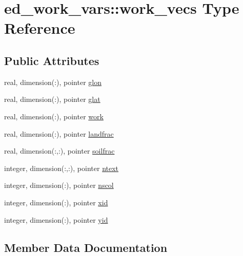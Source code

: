 \hypertarget{structed__work__vars_1_1work__vecs}{}\section{ed\+\_\+work\+\_\+vars\+:\+:work\+\_\+vecs Type Reference}
\label{structed__work__vars_1_1work__vecs}
\subsection*{Public Attributes}
\begin{DoxyCompactItemize}
\item 
real, dimension(\+:), pointer \hyperlink{structed__work__vars_1_1work__vecs_abee061861a4c4f6dfbc1bc8ec18a463b}{glon}
\item 
real, dimension(\+:), pointer \hyperlink{structed__work__vars_1_1work__vecs_a957e7ab559f48443828e710632887d48}{glat}
\item 
real, dimension(\+:), pointer \hyperlink{structed__work__vars_1_1work__vecs_aa5dbf6c86b514fd72da0b0121693fcb9}{work}
\item 
real, dimension(\+:), pointer \hyperlink{structed__work__vars_1_1work__vecs_a706bea04b2f0bd207bb88b24151b31f3}{landfrac}
\item 
real, dimension(\+:,\+:), pointer \hyperlink{structed__work__vars_1_1work__vecs_aaf7951b3fc6d10862e1a9110027766ea}{soilfrac}
\item 
integer, dimension(\+:,\+:), pointer \hyperlink{structed__work__vars_1_1work__vecs_a898272bb541b0bd262ff3efe1a0f919d}{ntext}
\item 
integer, dimension(\+:), pointer \hyperlink{structed__work__vars_1_1work__vecs_abcd125ac3a76abc44387395c1746d25b}{nscol}
\item 
integer, dimension(\+:), pointer \hyperlink{structed__work__vars_1_1work__vecs_afff01fc8dd99c5d3bbe9bbea9234381a}{xid}
\item 
integer, dimension(\+:), pointer \hyperlink{structed__work__vars_1_1work__vecs_a456fdc2f1a35f3a46bab6d6affac952e}{yid}
\end{DoxyCompactItemize}


\subsection{Member Data Documentation}
\mbox{\label{structed__work__vars_1_1work__vecs_a957e7ab559f48443828e710632887d48}} 
